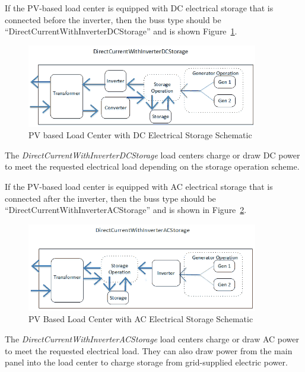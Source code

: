 If the PV-based load center is equipped with DC electrical storage that is connected before the inverter, then the buss type should be “DirectCurrentWithInverterDCStorage” and is shown Figure~\ref{fig:pv-based-load-center-with-dc-electrical}.

\begin{figure}[hbtp] %
\centering
\includegraphics[width=0.9\textwidth, height=0.9\textheight, keepaspectratio=true]{media/DCInverterWithDCStorageBussDiagram.png}
\caption{PV based Load Center with DC Electrical Storage Schematic \protect \label{fig:pv-based-load-center-with-dc-electrical}}
\end{figure}

The \emph{DirectCurrentWithInverterDCStorage} load centers charge or draw DC power to meet the requested electrical load depending on the storage operation scheme.

If the PV-based load center is equipped with AC electrical storage that is connected after the inverter, then the buss type should be “DirectCurrentWithInverterACStorage” and is shown in Figure~\ref{fig:pv-based-load-center-with-ac-electrical}.

\begin{figure}[hbtp] %
\centering
\includegraphics[width=0.9\textwidth, height=0.9\textheight, keepaspectratio=true]{media/DCInverterWithACStorageBussDiagram.png}
\caption{PV Based Load Center with AC Electrical Storage Schematic \protect \label{fig:pv-based-load-center-with-ac-electrical}}
\end{figure}

The \emph{DirectCurrentWithInverterACStorage} load centers charge or draw AC power to meet the requested electrical load.  They can also draw power from the main panel into the load center to charge storage from grid-supplied electric power.

